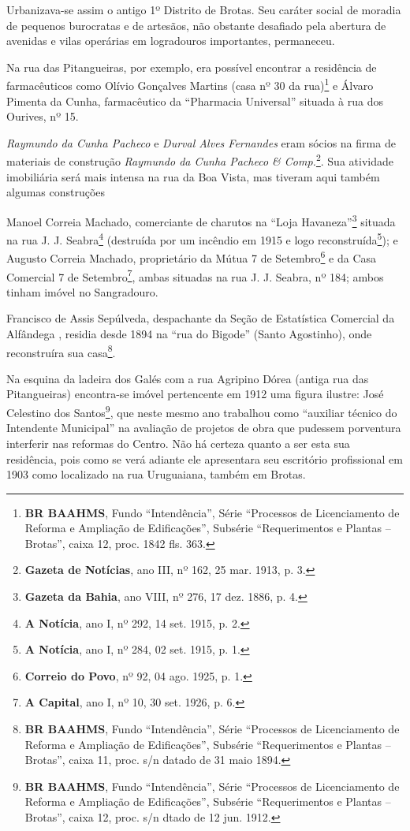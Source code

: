 
Urbanizava-se assim o antigo 1º Distrito de Brotas. Seu caráter social de moradia de pequenos burocratas e de artesãos, não obstante desafiado pela abertura de avenidas e vilas operárias em logradouros importantes, permaneceu.

Na rua das Pitangueiras, por exemplo, era possível encontrar a residência de farmacêuticos como Olívio Gonçalves Martins (casa nº 30 da rua)\footnote{\textbf{BR BAAHMS}, Fundo ``Intendência'', Série ``Processos de Licenciamento de Reforma e Ampliação de Edificações'', Subsérie ``Requerimentos e Plantas -- Brotas'', caixa 12, proc. 1842 fls. 363.} e Álvaro Pimenta da Cunha, farmacêutico da ``Pharmacia Universal'' situada à rua dos Ourives, nº 15\cite[p.~510]{reis_almanak_1903}.

\textit{Raymundo da Cunha Pacheco} e \textit{Durval Alves Fernandes} eram sócios na firma de materiais de construção \textit{Raymundo da Cunha Pacheco \& Comp.}\footnote{\textbf{Gazeta de Notícias}, ano III, nº 162, 25 mar. 1913, p. 3.}. Sua atividade imobiliária será mais intensa na rua da Boa Vista, mas tiveram aqui também algumas construções

Manoel Correia Machado, comerciante de charutos na ``Loja Havaneza''\footnote{\textbf{Gazeta da Bahia}, ano VIII, nº 276, 17 dez. 1886, p. 4.} situada na rua J. J. Seabra\footnote{\textbf{A Notícia}, ano I, nº 292, 14 set. 1915, p. 2.} (destruída por um incêndio em 1915 e logo reconstruída\footnote{\textbf{A Notícia}, ano I, nº 284, 02 set. 1915, p. 1.}); e Augusto Correia Machado, proprietário da Mútua 7 de Setembro\footnote{\textbf{Correio do Povo}, nº 92, 04 ago. 1925, p. 1.} e da Casa Comercial 7 de Setembro\footnote{\textbf{A Capital}, ano I, nº 10, 30 set. 1926, p. 6.}, ambas situadas na rua J. J. Seabra, nº 184; ambos tinham imóvel no Sangradouro. 

Francisco de Assis Sepúlveda, despachante da Seção de Estatística Comercial da Alfândega \cite[p.~306]{reis_almanak_1898}, residia desde 1894 na ``rua do Bigode'' (Santo Agostinho), onde reconstruíra sua casa\footnote{\textbf{BR BAAHMS}, Fundo ``Intendência'', Série ``Processos de Licenciamento de Reforma e Ampliação de Edificações'', Subsérie ``Requerimentos e Plantas -- Brotas'', caixa 11, proc. s/n datado de 31 maio 1894.}.

Na esquina da ladeira dos Galés com a rua Agripino Dórea (antiga rua das Pitangueiras) encontra-se imóvel pertencente em 1912 uma figura ilustre: José Celestino dos Santos\footnote{\textbf{BR BAAHMS}, Fundo ``Intendência'', Série ``Processos de Licenciamento de Reforma e Ampliação de Edificações'', Subsérie ``Requerimentos e Plantas -- Brotas'', caixa 12, proc. s/n dtado de 12 jun. 1912.}, que neste mesmo ano trabalhou como ``auxiliar técnico do Intendente Municipal'' na avaliação de projetos de obra que pudessem porventura interferir nas reformas do Centro. Não há certeza quanto a ser esta sua residência, pois como se verá adiante ele apresentara seu escritório profissional em 1903 como localizado na rua Uruguaiana, também em Brotas.

